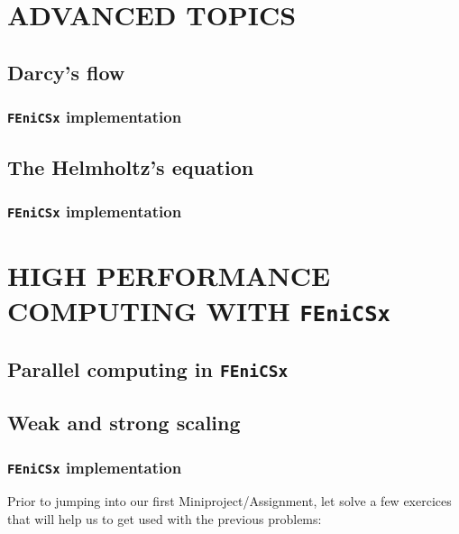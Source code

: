 \chapter{ADVANCED TOPICS}

\section{Darcy's flow}

\subsection{\texttt{FEniCSx} implementation}

\section{The Helmholtz's equation}

\subsection{\texttt{FEniCSx} implementation}

\setchapterpreamble[u]{\margintoc}
\chapter{HIGH PERFORMANCE COMPUTING WITH \texttt{FEniCSx}}


\section{Parallel computing in \texttt{FEniCSx}}

\section{Weak and strong scaling}

\subsection{\texttt{FEniCSx} implementation}


\iffalse

Prior to jumping into our first Miniproject/Assignment, let solve a few exercices that will
help us to get used with the previous problems:

